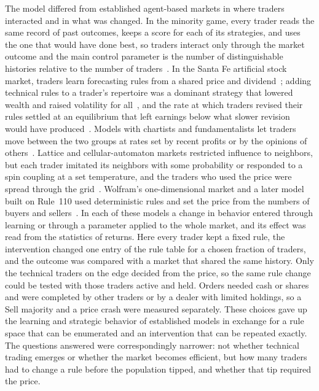 The model differed from established agent-based markets in where traders
interacted and in what was changed. In the minority game, every trader reads
the same record of past outcomes, keeps a score for each of its strategies,
and uses the one that would have done best, so traders interact only through
the market outcome and the main control parameter is the number of
distinguishable histories relative to the number of
traders~\cite{challet1997minority,challet2000modeling}. In the Santa Fe
artificial stock market, traders learn forecasting rules from a shared price
and dividend~\cite{lebaron1999time}; adding technical rules to a trader's
repertoire was a dominant strategy that lowered wealth and raised volatility
for all~\cite{joshi1999technical}, and the rate at which traders revised
their rules settled at an equilibrium that left earnings below what slower
revision would have produced~\cite{joshi2002financial}. Models with
chartists and fundamentalists let traders move between the two groups at
rates set by recent profits or by the opinions of
others~\cite{lux1999scaling,brock1998heterogeneous,kirman1993ants}. Lattice
and cellular-automaton markets restricted influence to neighbors, but each
trader imitated its neighbors with some probability or responded to a spin
coupling at a set temperature, and the traders who used the price were
spread through the
grid~\cite{bornholdt2001ising,iori2002microsimulation,bartolozzi2004stochastic,qiu2007cellular,sornette2006importance,fan2009effect,atman2012influence}.
Wolfram's one-dimensional market and a later model built on Rule~110 used
deterministic rules and set the price from the numbers of buyers and
sellers~\cite{wolfram2002new,valsan2022on}. In each of these models a change
in behavior entered through learning or through a parameter applied to the
whole market, and its effect was read from the statistics of returns. Here
every trader kept a fixed rule, the intervention changed one entry of the
rule table for a chosen fraction of traders, and the outcome was compared
with a market that shared the same history. Only the technical traders on
the edge decided from the price, so the same rule change could be tested
with those traders active and held. Orders needed cash or shares and were
completed by other traders or by a dealer with limited holdings, so a Sell
majority and a price crash were measured separately. These choices gave up
the learning and strategic behavior of established models in exchange for a
rule space that can be enumerated and an intervention that can be repeated
exactly. The questions answered were correspondingly narrower: not whether
technical trading emerges or whether the market becomes efficient, but how
many traders had to change a rule before the population tipped, and whether
that tip required the price.

